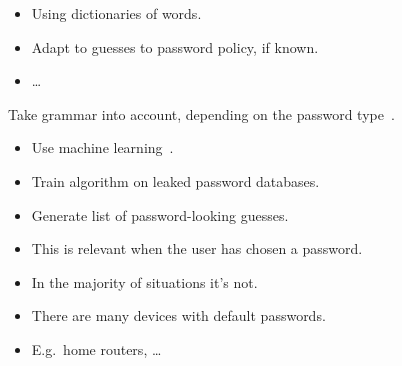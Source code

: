 \begin{frame}
  \begin{example}
    \begin{itemize}
      \item Using dictionaries of words.
      \item Adapt to guesses to password policy, if known.
      \item \dots
    \end{itemize}
  \end{example}

  \pause{}

  \begin{example}
    Take grammar into account, depending on the password 
    type~\cite{Bonneau2012ghs,Bonneau2012lpo}.
  \end{example}
\end{frame}

\begin{frame}
  \begin{example}
    \begin{itemize}
      \item Use machine learning~\cite{JohnTheRipper,OMEN,WeirPCFG}.
      \item Train algorithm on leaked password databases.
      \item Generate list of password-looking guesses.
    \end{itemize}
  \end{example}
\end{frame}

\begin{frame}
  \begin{remark}
    \begin{itemize}
      \item This is relevant when the user has chosen a password.
      \item In the majority of situations it's not.
    \end{itemize}
  \end{remark}

  \pause{}

  \begin{example}
    \begin{itemize}
      \item There are many devices with default passwords.
      \item E.g.\ home routers, \dots
    \end{itemize}
  \end{example}
\end{frame}

